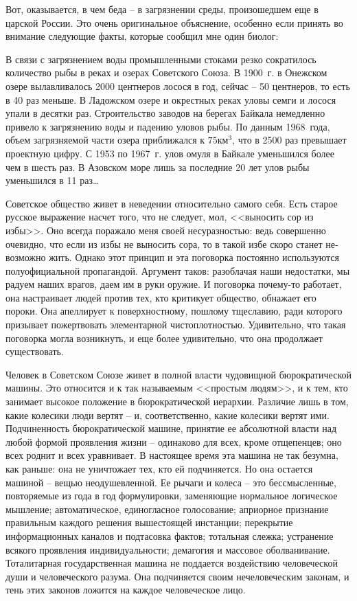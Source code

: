 \documentclass{book}
\begin{document}
Вот, оказывается, в чем беда -- в загрязнении среды, прои­зошедшем еще в царской России. Это очень оригинальное объяснение, 
особенно если принять во внимание следующие факты, которые сообщил мне один биолог:

В связи с загрязнением воды промышленными стоками резко сократилось количество рыбы в реках и озерах Советского Союза. В 1900~г. 
в Онежском озере вылавливалось 2000 центнеров лосося в год, сейчас -- 50 центнеров, то есть в 40 раз меньше. В Ладожском озере и 
окрестных реках уловы семги и лосося упали в десятки раз. Строительство заводов на берегах Байкала немедленно привело к 
загрязнению воды и падению уловов рыбы. По данным 1968~года, объем загрязняемой части озера приближался к $75 \text{км}^3$, что в 2500 раз 
превышает проектную цифру. С 1953 по 1967~г. улов омуля в Байкале уменьшился более чем в шесть раз. В Азовском море лишь за 
последние 20 лет улов рыбы уменьшился в 11 раз\ldots

Советское общество живет в неведении относительно самого себя. Есть старое русское выражение насчет того, что не следует, мол, 
<<выносить сор из избы>>. Оно всегда поражало меня своей несуразностью: ведь совершенно очевидно, что если из избы не выносить 
сора, то в такой избе скоро станет не­возможно жить. Однако этот принцип и эта поговорка постоянно используются полуофициальной 
пропагандой. Аргумент таков: разоблачая наши недостатки, мы радуем наших врагов, даем им в руки оружие. И поговорка почему-то 
работает, она настраивает людей против тех, кто критикует общество, обнажает его пороки. Она апеллирует к поверхностному, 
пошлому тщеславию, ради которого призывает пожертвовать элементарной чистоплотностью. Удивительно, что такая поговорка могла 
возникнуть, и еще более удивительно, что она продолжает существовать.

Человек в Советском Союзе живет в полной власти чудовищной бюрократической машины. Это относится и к так называемым <<простым 
людям>>, и к тем, кто занимает высокое положение в бюрократической иерархии. Различие лишь в том, какие колесики люди вертят -- 
и, соответственно, какие колесики вертят ими.  Подчиненность бюрократической машине, принятие ее абсолютной власти над любой 
формой проявления жизни -- одинаково для всех, кроме отщепенцев; оно всех роднит и всех уравнивает. В настоящее время эта машина 
не так безумна, как раньше: она не уничтожает тех, кто ей подчиняется. Но она остается машиной -- вещью неодушевленной. Ее 
рычаги и колеса -- это бессмысленные, повторяемые из года в год формулировки, заменяющие нормальное логическое мышление; 
автоматическое, единогласное голосование; априорное признание правильным каждого решения вышестоящей инстанции; перекрытие 
информационных каналов и подтасовка фактов; тотальная слежка; устранение всякого проявле­ния индивидуальности; демагогия и 
массовое оболванивание. Тоталитарная государственная машина не поддается воздействию человеческой души и человеческого разума. 
Она подчиняется своим нечеловеческим законам, и тень этих законов ложится на каждое человеческое лицо.
\end{document}
